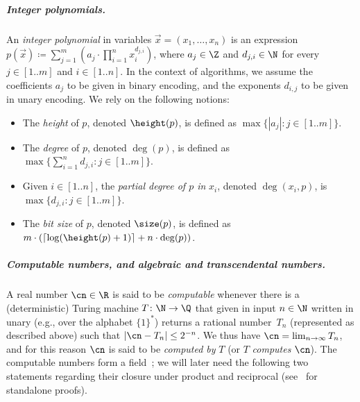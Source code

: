 \subparagraph*{Integer polynomials.}
An \emph{integer polynomial} in variables $\vec x = (x_1,\dots,x_n)$ is an
expression $p(\vec x) \coloneqq \sum_{j = 1}^m (a_j \cdot \prod_{i=1}^n
x_i^{d_{j,i}})$, where $a_j \in \Z$ and $d_{j,i} \in \N$ for every $j \in
[1..m]$ and $i \in [1..n]$. In the context of algorithms, we assume the
coefficients $a_j$ to be given in binary encoding, and the exponents $d_{i,j}$
to be given in unary encoding. We rely on the following notions:
\begin{itemize}
  \item The \emph{height} of $p$, denoted $\height(p)$, is defined as
  $\max\{|a_j| : j \in [1..m]\}$. 
  \item  The \emph{degree} of $p$, denoted $\deg(p)$, is defined as
  $\max\{\sum_{i=1}^n d_{j,i} : j \in [1..m]\}$.
  \item Given $i \in [1..n]$, the \emph{partial degree of $p$ in} $x_i$, denoted
  $\deg(x_i,p)$, is $\max\{ d_{j,i} : j \in
  [1..m] \}$. 
  \item The \emph{bit size} of $p$, denoted $\size(p)$, is defined as $m \cdot
  (\ceil{\log(\height(p)+1)} + n \cdot \deg(p))$.
\end{itemize}

\subparagraph*{Computable numbers, and algebraic and transcendental numbers.}
A real number $\cn \in \R$ is said to be \emph{computable} whenever there is a
(deterministic) Turing machine $T \colon \N \to \Q$ that given in input $n \in
\N$ written in unary (e.g., over the alphabet $\{1\}^*$) returns a rational
number~$T_n$ (represented as described above) such that $\abs{\cn-T_n} \leq
2^{-n}$. We thus have $\cn = \lim_{n \to \infty} T_n$, and for this reason $\cn$
is said to be \emph{computed by} $T$ (or $T$ \emph{computes} $\cn$).
The computable numbers form a field~\cite{Rice54}; 
we will later need the following two statements regarding
their closure under product and reciprocal 
(see~ for standalone proofs).


